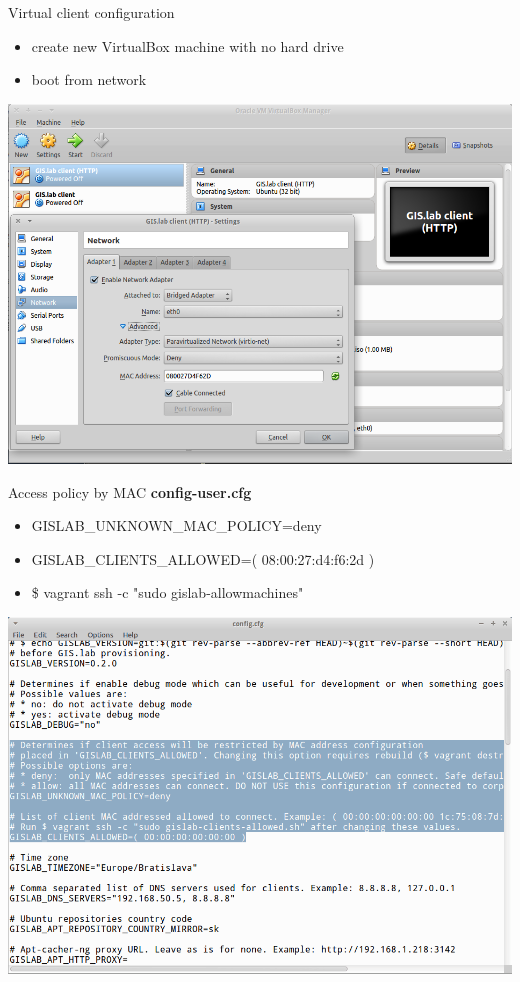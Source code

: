 \documentclass[12pt]{beamer}
\begin{document}
\begin{frame}{Virtual client configuration}
	\begin{itemize}
		\item create new VirtualBox machine with no hard drive
		\item boot from network
	\end{itemize}
	\begin{center}
		\includegraphics[keepaspectratio=true,height=0.6\textheight]{images/real-world-example/client-virtualbox-configuration.png}
	\end{center}
\end{frame}


\begin{frame}{Access policy by MAC}
	\textbf{config-user.cfg}
	\begin{itemize}
		\item GISLAB_UNKNOWN_MAC_POLICY=deny
		\item GISLAB_CLIENTS_ALLOWED=( 08:00:27:d4:f6:2d )
		\item \$ vagrant ssh -c "sudo gislab-allowmachines"
	\end{itemize}
	\begin{center}
		\includegraphics[keepaspectratio=true,height=0.5\textheight]{images/real-world-example/config-cfg.png}
	\end{center}
\end{frame}
\end{document}
